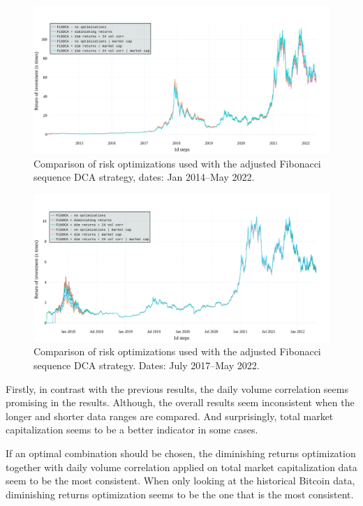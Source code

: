\begin{figure}[!hbt]
    \centering
    \includegraphics[width=\columnwidth]{figures/evaluation-dca-optimization-longer.pdf}
    \caption{Comparison of risk optimizations used with the adjusted Fibonacci sequence DCA strategy, dates: Jan 2014--May 2022.}
    \label{figure-dca-optimization-longer}
\end{figure}

\begin{figure}[!hbt]
    \centering
    \includegraphics[width=\columnwidth]{figures/evaluation-dca-optimization-shorter.pdf}
    \caption{Comparison of risk optimizations used with the adjusted Fibonacci sequence DCA strategy. Dates: July 2017--May 2022.}
    \label{figure-dca-optimization-shorter}
\end{figure}

Firstly, in contrast with the previous results, the daily volume correlation seems promising in the results. Although, the overall results seem inconsistent when the longer and shorter data ranges are compared. And surprisingly, total market capitalization seems to be a better indicator in some cases.

If an optimal combination should be chosen, the diminishing returns optimization together with daily volume correlation applied on total market capitalization data seem to be the most consistent. When only looking at the historical Bitcoin data, diminishing returns optimization seems to be the one that is the most consistent.

